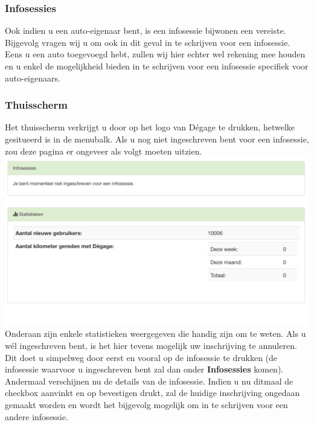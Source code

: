 \documentclass[11pt,a4paper,oneside]{article}
\begin{document}
\subsubsection{Infosessies}
Ook indien u een auto-eigenaar bent, is een infosessie bijwonen een vereiste. Bijgevolg vragen wij u om ook in dit geval  in te schrijven voor een infosessie. Eens u een auto toegevoegd hebt, zullen wij hier echter wel rekening mee houden en u enkel de mogelijkheid bieden in te schrijven voor een infosessie specifiek voor auto-eigenaars.

\subsubsection{Thuisscherm}
Het thuisscherm verkrijgt u door op het logo van D\'egage te drukken, hetwelke gesitueerd is in de menubalk. Als u nog niet ingeschreven bent voor een infosessie, zou deze pagina er ongeveer als volgt moeten uitzien.  \\
\includegraphics[scale=0.5]{img/home-autolener} \\
Onderaan zijn enkele statistieken weergegeven die handig zijn om te weten.
Als u w\'el ingeschreven bent, is het hier tevens mogelijk uw inschrijving te annuleren. Dit doet u simpelweg door eerst en vooral op de infosessie te drukken (de infosessie waarvoor u ingeschreven bent zal dan onder \textbf{Infosessies} komen). Andermaal verschijnen nu de details van de infosessie. Indien u nu ditmaal de checkbox aanvinkt en op bevestigen drukt, zal de huidige inschrijving ongedaan gemaakt worden en wordt het bijgevolg mogelijk om  in te schrijven voor een andere infosessie.
\end{document}
